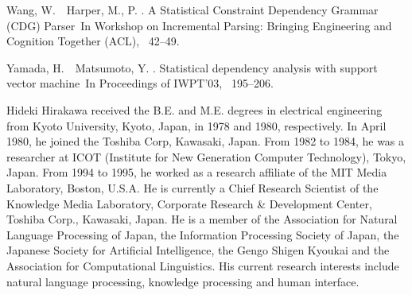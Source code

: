 \begin{thebibliography}{}
Wang, W.\BBACOMMA\  \BBA\ Harper, M., P. \BBCP.
\newblock \BBOQ A Statistical Constraint Dependency Grammar (CDG) Parser\BBCQ\
\newblock In {\Bem Workshop on Incremental Parsing: Bringing Engineering and
  Cognition Together (ACL)}, \BPGS\ 42--49.

Yamada, H.\BBACOMMA\  \BBA\ Matsumoto, Y. \BBOP 2003\BBCP.
\newblock \BBOQ Statistical dependency analysis with support vector
  machine\BBCQ\
\newblock In {\Bem Proceedings of IWPT'03}, \BPGS\ 195--206.

\end{thebibliography}

\begin{biography}

\biotitle{}

{

Hideki Hirakawa received the B.E. and M.E. degrees in electrical
engineering from Kyoto University, Kyoto, Japan, in 1978 and 1980,
respectively. In April 1980, he joined the Toshiba Corp, Kawasaki,
Japan. From 1982 to 1984, he was a researcher at ICOT (Institute for
New Generation Computer Technology), Tokyo, Japan. From 1994 to 1995,
he worked as a research affiliate of the MIT Media Laboratory, Boston,
U.S.A. He is currently a Chief Research Scientist of the Knowledge
Media Laboratory, Corporate Research \& Development Center, Toshiba
Corp., Kawasaki, Japan. He is a member of the Association for Natural
Language Processing of Japan, the Information Processing Society of
Japan, the Japanese Society for Artificial Intelligence, the Gengo
Shigen Kyoukai and the Association for Computational Linguistics.  His
current research interests include natural language processing,
knowledge processing and human interface.

}


\end{biography}



